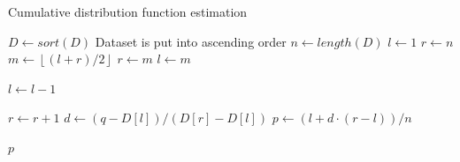 \documentclass[10pt,final]{siamltex}
\begin{document}
\begin{algorithm}
  \caption{Cumulative distribution function estimation}
  \label{cdf_algo}
  \begin{algorithmic}[1]
    \State $D \gets sort(D)$
    \Comment Dataset is put into ascending order
    \State $n \gets length(D)$
    \State $l \gets 1$
    \State $r \gets n$
    \State $m \gets \left \lfloor{(l+r)/2}\right \rfloor$
    \State $r \gets m$
    \Else
    \State $l \gets m$
    \EndIf
    \EndWhile


    \State $l \gets l - 1$
    \EndWhile

    \State $r \gets r + 1$
    \EndWhile
    \State $d \gets (q-D[l])/(D[r]-D[l])$
    \State $p \gets (l + d \cdot (r - l))/n $

    \EndIf

    \State \Return $p$
    \EndFunction
\end{algorithmic}
\end{algorithm}
\end{document}
